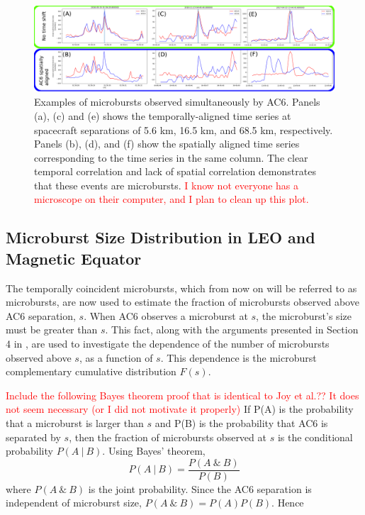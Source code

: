 \documentclass[draft]{agujournal2019}
\begin{document}
\begin{figure}
\includegraphics[width=\textwidth]{fig2.png}
\caption{Examples of microbursts observed simultaneously by AC6. Panels (a), (c) and (e) shows the temporally-aligned time series at spacecraft separations of 5.6 km, 16.5 km, and 68.5 km, respectively. Panels (b), (d), and (f) show the spatially aligned time series corresponding to the time series in the same column. The clear temporal correlation and lack of spatial correlation demonstrates that these events are microbursts. \textcolor{red}{I know not everyone has a microscope on their computer, and I plan to clean up this plot.}} 
\label{fig2}
\end{figure}
	

\subsection{Microburst Size Distribution in LEO and Magnetic Equator}\label{microburst_distribution}
The temporally coincident microbursts, which from now on will be referred to as microbursts, are now used to estimate the fraction of microbursts observed above AC6 separation, $s$. When AC6 observes a microburst at $s$, the microburst's size must be greater than $s$. This fact, along with the arguments presented in Section 4 in , are used to investigate the dependence of the number of microbursts observed above $s$, as a function of $s$. This dependence is the microburst complementary cumulative distribution $F(s)$. 

\iffalse
\textcolor{red}{Include the following Bayes theorem proof that is identical to Joy et al.?? It does not seem necessary (or I did not motivate it properly)} If P(A) is the probability that a microburst is larger than $s$ and P(B) is the probability that AC6 is separated by $s$, then the fraction of microbursts observed at $s$ is the conditional probability $P(A \ \vert \ B)$. Using Bayes’ theorem, 
\begin{equation}
P(A \ \vert \ B) = \frac{P(A \ \& \ B)}{P(B)}
\end{equation} where $P(A \ \& \ B)$ is the joint probability. Since the AC6 separation is independent of microburst size, $P(A \ \& \ B) = P(A)P(B)$. Hence
\end{document}
